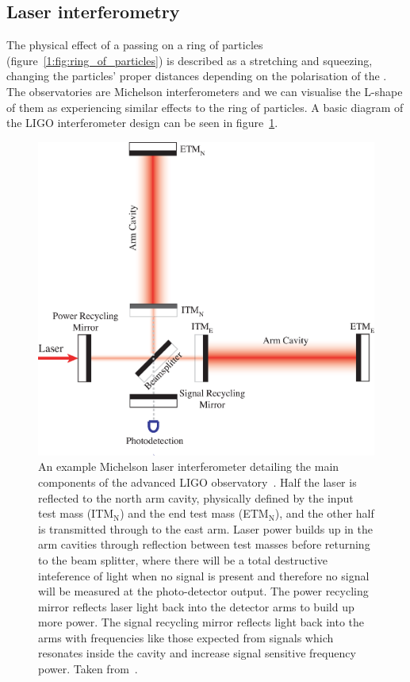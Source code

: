 \subsection{\label{1:sec:laser_interferometry}Laser interferometry}

The physical effect of a passing \gw on a ring of particles (figure~\ref{1:fig:ring_of_particles}) is described as a stretching and squeezing, changing the particles' proper distances depending on the polarisation of the \gw. The \gwadj observatories are Michelson interferometers and we can visualise the L-shape of them as experiencing similar effects to the ring of particles. A basic diagram of the LIGO interferometer design can be seen in figure~\ref{1:fig:ifo}.
%
\begin{figure}
    \centering
    \includegraphics[width=1.0\linewidth]{images/1_general_relativity/gravitational_wave_detection/IFO.eps}
    \caption{An example Michelson laser interferometer detailing the main components of the advanced LIGO \gwadj observatory~\cite{aLIGO:2015}. Half the laser is reflected to the north arm cavity, physically defined by the input test mass (ITM$_{\text{N}}$) and the end test mass (ETM$_{\text{N}}$), and the other half is transmitted through to the east arm. Laser power builds up in the arm cavities through reflection between test masses before returning to the beam splitter, where there will be a total destructive inteference of light when no \gwadj signal is present and therefore no signal will be measured at the photo-detector output. The power recycling mirror reflects laser light back into the detector arms to build up more power. The signal recycling mirror reflects light back into the arms with frequencies like those expected from \gwadj signals which resonates inside the cavity and increase signal sensitive frequency power. Taken from~\cite{IFO_diagram:2008}.}
    \label{1:fig:ifo}
\end{figure}
%

